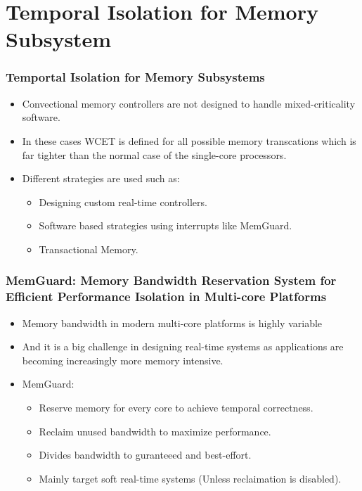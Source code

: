 \documentclass{beamer}
\begin{document}
\section{Temporal Isolation for Memory Subsystem}
\begin{frame}
    \frametitle{Temportal Isolation for Memory Subsystems}
    \begin{itemize}
        \item Convectional memory controllers are not designed to handle
            mixed-criticality software.
        \item In these cases WCET is defined for all possible memory
            transcations which is far tighter than the normal case of the
            single-core processors.
        \item Different strategies are used such as:
            \begin{itemize}
                \item Designing custom real-time controllers.
                \item Software based strategies using interrupts like MemGuard.
                \item Transactional Memory.
            \end{itemize}
    \end{itemize}
\end{frame}
\begin{frame}
    \frametitle{MemGuard: Memory Bandwidth Reservation System for Efficient
    Performance Isolation in Multi-core Platforms}
    \begin{itemize}
        \item Memory bandwidth in modern multi-core platforms is highly
            variable
        \item And it is a big challenge in designing real-time systems as
            applications are becoming increasingly more memory intensive.
        \item MemGuard:
            \begin{itemize}
                \item Reserve memory for every core to achieve temporal
                    correctness.
                \item Reclaim unused bandwidth to maximize performance.
                \item Divides bandwidth to guranteeed and best-effort.
                \item Mainly target soft real-time systems
                    (Unless reclaimation is disabled).
            \end{itemize}
    \end{itemize}
\end{frame}
\end{document}
